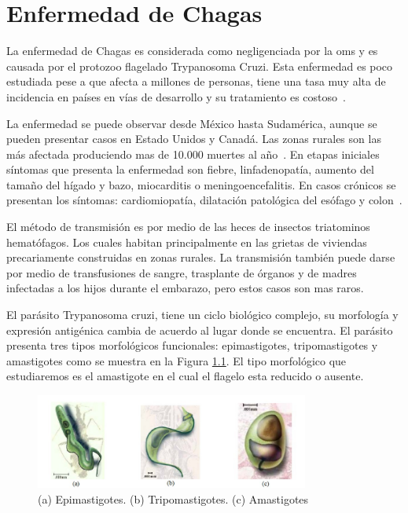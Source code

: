 \chapter{Enfermedad de Chagas}
\label{chap:chagas}

La enfermedad de Chagas es considerada como negligenciada por la \gls{oms} y es causada por el protozoo flagelado Trypanosoma Cruzi. Esta enfermedad es poco estudiada pese a que afecta a millones de personas, tiene una tasa muy alta de incidencia en países en vías de desarrollo y su tratamiento es  costoso~\cite{trouiller2002drug}. 

La enfermedad se puede observar desde México hasta Sudamérica, aunque se pueden presentar casos en Estado Unidos y Canadá. Las zonas rurales son las más afectada produciendo mas de 10.000 muertes al año~\cite{lozano2013global}. En etapas iniciales síntomas que presenta la enfermedad son fiebre, linfadenopatía, aumento del tamaño del hígado y bazo, miocarditis o meningoencefalitis. En casos crónicos se presentan los síntomas: cardiomiopatía, dilatación patológica del esófago y colon~\cite{nery1968surto}. 

El método de transmisión es por medio de las heces de insectos triatominos hematófagos. Los cuales habitan principalmente en las grietas de viviendas precariamente construidas en zonas rurales. La transmisión también puede darse por medio de transfusiones de sangre, trasplante de órganos y de madres infectadas a los hijos durante el embarazo, pero estos casos son mas raros.

El parásito Trypanosoma cruzi, tiene un ciclo biológico complejo, su morfología y expresión antigénica cambia de acuerdo al lugar donde se encuentra. El parásito presenta tres tipos morfológicos funcionales: epimastigotes, tripomastigotes y amastigotes como se muestra en la Figura \ref{img:imagen-amastigotes1}. El tipo morfológico que estudiaremos es el amastigote en el cual el flagelo esta reducido o ausente.

\begin{figure}[h!]
\centering
\includegraphics[width=90mm]{./figuras/amastigotes1.jpg}
\caption{(a) Epimastigotes. (b) Tripomastigotes. (c) Amastigotes}
\label{img:imagen-amastigotes1}
\end{figure}

